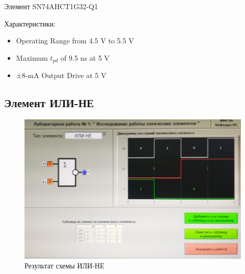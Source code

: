 Элемент SN74AHCT1G32-Q1

Характеристики:
\begin{itemize}
	\item Operating Range from 4.5 V to 5.5 V
	\item Maximum $t_{pd}$ of 9.5 ns at 5 V
	\item ±8-mA Output Drive at 5 V
\end{itemize}

\subsection{Элемент ИЛИ-НЕ}

\begin{figure}[H]
	\centering
	\includegraphics[width=0.85\linewidth]{imgs/1/or-not}
	\caption{Результат схемы ИЛИ-НЕ}
	\label{fig:1_or-not}
\end{figure}

